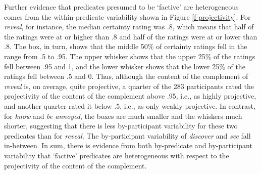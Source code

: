 \documentclass[11pt,fleqn]{article}
\newcommand{\6}{\mbox{$[\hspace*{-.6mm}[$}}
\newcommand{\9}{\mbox{$]\hspace*{-.6mm}]$}}
\begin{document}
Further evidence that predicates presumed to be `factive' are heterogeneous comes from the within-predicate variability shown in Figure \ref{f-projectivity}. For {\em reveal}, for instance, the median certainty rating was .8, which means that half of the ratings were at or higher than .8 and half of the ratings were at or lower than .8. The box, in turn, shows that the middle 50\% of certainty ratings fell in the range from .5 to .95. The upper whisker shows that the upper 25\% of the ratings fell between .95 and 1, and the lower whisker shows that the lower 25\% of the ratings fell between .5 and 0. Thus, although the content of the complement of {\em reveal} is, on average, quite projective, a quarter of the 283 participants rated the projectivity of the content of the complement above .95, i.e., as highly projective, and another quarter rated it below .5, i.e., as only weakly projective. In contrast, for {\em know} and {\em be annoyed}, the boxes are much smaller and the whiskers much shorter, suggesting that there is less by-participant variability for these two predicates than for {\em reveal}. The by-participant variability of {\em discover} and {\em see} fall in-between. In sum, there is evidence from both by-predicate and by-participant variability that `factive' predicates are heterogeneous with respect to the projectivity of the content of the complement.
\end{document}
